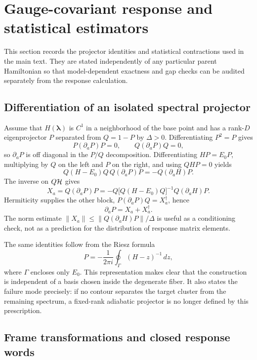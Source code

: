 \section{Gauge-covariant response and statistical estimators}
\label{app:methods}

This section records the projector identities and statistical contractions
used in the main text.  They are stated independently of any particular parent
Hamiltonian so that model-dependent exactness and gap checks can be audited
separately from the response calculation.

\subsection{Differentiation of an isolated spectral projector}

Assume that $H(\boldsymbol\lambda)$ is $C^1$ in a neighborhood of the base
point and has a rank-$D$ eigenprojector $P$ separated from $Q=1-P$ by
$\Delta>0$.  Differentiating $P^2=P$ gives
\[
 P(\partial_aP)P=0,
 \qquad
 Q(\partial_aP)Q=0,
\]
so $\partial_aP$ is off diagonal in the $P/Q$ decomposition.  Differentiating
$HP=E_0P$, multiplying by $Q$ on the left and $P$ on the right, and using
$QHP=0$ yields
\[
 Q(H-E_0)Q\,Q(\partial_aP)P=-Q(\partial_aH)P.
\]
The inverse on $Q\mathcal H$ gives
\begin{equation}
 X_a=Q(\partial_aP)P
 =-Q\bigl[Q(H-E_0)Q\bigr]^{-1}Q(\partial_aH)P.
 \label{eq:supp-response}
\end{equation}
Hermiticity supplies the
other block, $P(\partial_aP)Q=X_a^\dagger$, hence
\[
 \partial_aP=X_a+X_a^\dagger.
\]
The norm estimate
$\lVert X_a\rVert\leq\lVert Q(\partial_aH)P\rVert/\Delta$
is useful as a conditioning check, not as a prediction for the distribution
of response matrix elements.

The same identities follow from the Riesz formula
\[
 P=-\frac{1}{2\pi i}\oint_\Gamma(H-z)^{-1}\,dz,
\]
where $\Gamma$ encloses only $E_0$.  This representation makes clear that the
construction is independent of a basis chosen inside the degenerate fiber.
It also states the failure mode precisely: if no contour separates the target
cluster from the remaining spectrum, a fixed-rank adiabatic projector is no
longer defined by this prescription.

\subsection{Frame transformations and closed response words}

